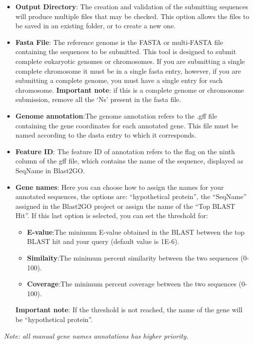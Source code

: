 \begin{itemize}
 \item \textbf{Output Directory}: The creation and validation of the submitting
 sequences will produce multiple files that may be checked. This option allows
 the files to be saved in an existing folder, or to create a new one.

 \item \textbf{Fasta File}: The reference genome is the FASTA or multi-FASTA
 file containing the sequences to be submitted. This tool is designed to submit
 complete eukaryotic genomes or chromosomes. If you are submitting a single
 complete chromosome it must be in a single fasta entry, however, if you are
 submitting a complete genome, you must have a single entry for each chromosome.
 \textbf{Important note}: if this is a complete genome or chromosome submission,
  remove all the `Ns' present in the fasta file.

 \item \textbf{Genome annotation}:The genome annotation refers to the .gff file
 containing the gene coordinates for each annotated gene. This file must be
 named according to the dasta entry to which it corresponds.

 \item \textbf{Feature ID}: The feature ID of annotation refers to the flag on
 the ninth column of the gff file, which contains the name of the sequence,
 displayed as SeqName in Blast2GO.

 \item \textbf{Gene names}:  Here you can choose how to assign the names for
 your annotated sequences, the options are: ``hypothetical protein'', the
 ``SeqName'' assigned in the Blast2GO project or assign the name of the ``Top
 BLAST Hit''.
 If this last option is selected, you can set the threshold for:
 \begin{itemize}
   \item \textbf{E-value}:The minimum E-value obtained in the BLAST between the
   top BLAST hit and your query (default value is 1E-6).
   \item \textbf{Similaity}:The minimum percent similarity between the two
   sequences (0-100).
   \item \textbf{Coverage}:The minimum percent coverage between the two
   sequences (0-100).
\end{itemize}
\textbf{Important note}: If the threshold is not reached, the name of the gene
will be ``hypothetical protein''.
\end{itemize}
\textit{Note: all manual gene names annotations has higher priority.}

